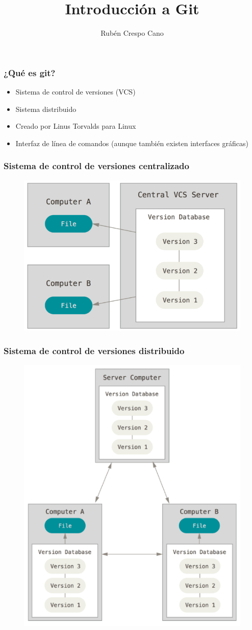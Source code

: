 \documentclass{beamer}
\title[Introducción a Git]{Introducción a Git}
\author{Rubén Crespo Cano}
\institute[]
{
https://about.me/rubencrespocano \\
\medskip
\textit{@rcrespocano}
}
\date{}
\begin{document}
\begin{frame}
\titlepage
\end{frame}

\begin{frame}
\frametitle{¿Qué es git?}
\begin{itemize}
\item Sistema de control de versiones (VCS)
\item Sistema distribuido
\item Creado por Linus Torvalds para Linux
\item Interfaz de línea de comandos (aunque también existen interfaces gráficas)
\end{itemize}
\end{frame}

\begin{frame}
\frametitle{Sistema de control de versiones centralizado}
\begin{figure}
\includegraphics[width=0.50\linewidth]{img/centralized.png}
\end{figure}
\end{frame}

\begin{frame}
\frametitle{Sistema de control de versiones distribuido}
\begin{figure}
\includegraphics[width=0.50\linewidth]{img/distributed.png}
\end{figure}
\end{frame}
\end{document}
